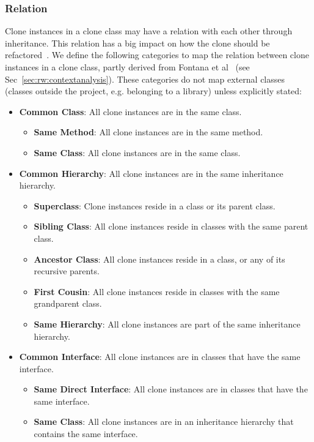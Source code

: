 \documentclass[sigconf,review,anonymous]{acmart}
\begin{document}
\subsubsection{Relation}\label{sec:relation}
Clone instances in a clone class may have a relation with each other through inheritance. This relation has a big impact on how the clone should be refactored~\cite{fontana2015duplicated}. We define the following categories to map the relation between clone instances in a clone class, partly derived from Fontana et al~\cite{fontana2015duplicated} (see Sec~\ref{sec:rw:contextanalysis}). These categories do not map external classes (classes outside the project, e.g. belonging to a library) unless explicitly stated:
\begin{itemize}
    \item \textbf{Common Class}: All clone instances are in the same class.
    \begin{itemize}
        \item \textbf{Same Method}: All clone instances are in the same method.
        \item \textbf{Same Class}: All clone instances are in the same class.
    \end{itemize}
    \item \textbf{Common Hierarchy}: All clone instances are in the same inheritance hierarchy.
    \begin{itemize}
        \item \textbf{Superclass}: Clone instances reside in a class or its parent class.
        \item \textbf{Sibling Class}: All clone instances reside in classes with the same parent class.
        \item \textbf{Ancestor Class}: All clone instances reside in a class, or any of its recursive parents.
        \item \textbf{First Cousin}: All clone instances reside in classes with the same grandparent class.
        \item \textbf{Same Hierarchy}: All clone instances are part of the same inheritance hierarchy.
    \end{itemize}
    \item \textbf{Common Interface}: All clone instances are in classes that have the same interface.
    \begin{itemize}
        \item \textbf{Same Direct Interface}: All clone instances are in classes that have the same interface.
        \item \textbf{Same Class}: All clone instances are in an inheritance hierarchy that contains the same interface.

\end{itemize}
\end{itemize}
\end{document}
